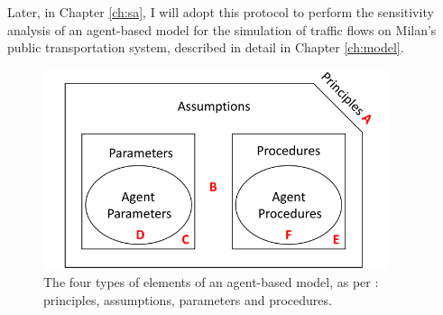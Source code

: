 Later, in Chapter \ref{ch:sa}, I will adopt this protocol to perform the sensitivity analysis of an agent-based model for the simulation of traffic flows on Milan's public transportation system, described in detail in Chapter \ref{ch:model}.
\begin{figure}[H]
    \centering
    \includegraphics[width = 0.9\textwidth]{tex/pics/borgonovo_elements.png}
    \caption{The four types of elements of an agent-based model, as per \textcite{Borgonovo2022SensitivityAO}: principles, assumptions, parameters and procedures.}
    \label{fig:borgonovo_elements}
\end{figure}